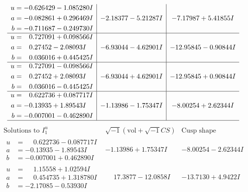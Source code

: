 \documentclass[1p]{elsarticle_modified}
\theoremstyle{definition}
\newcommand{\I}{\sqrt{-1}}
\begin{document}
$$\begin{array}{c|c|c}
\begin{aligned}
u &= -0.626429 - 1.085280 I \\
a &= -0.082861 + 0.296469 I \\
b &= -0.711687 - 0.249730 I\end{aligned}
 & -2.18377 - 5.21287 I & -7.17987 + 5.41855 I \\ \hline\begin{aligned}
u &= \phantom{-}0.727091 + 0.098566 I \\
a &= \phantom{-}0.27452 - 2.08093 I \\
b &= \phantom{-}0.036016 + 0.445425 I\end{aligned}
 & -6.93044 - 4.62901 I & -12.95845 - 0.90844 I \\ \hline\begin{aligned}
u &= \phantom{-}0.727091 - 0.098566 I \\
a &= \phantom{-}0.27452 + 2.08093 I \\
b &= \phantom{-}0.036016 - 0.445425 I\end{aligned}
 & -6.93044 + 4.62901 I & -12.95845 + 0.90844 I \\ \hline\begin{aligned}
u &= \phantom{-}0.622736 + 0.087717 I \\
a &= -0.13935 + 1.89543 I \\
b &= -0.007001 - 0.462890 I\end{aligned}
 & -1.13986 - 1.75347 I & -8.00254 + 2.62344 I\\
 \hline 
 \end{array}$$\newpage$$\begin{array}{c|c|c}  
\text{Solutions to }I^u_{1}& \I (\text{vol} + \sqrt{-1}CS) & \text{Cusp shape}\\
 \hline 
\begin{aligned}
u &= \phantom{-}0.622736 - 0.087717 I \\
a &= -0.13935 - 1.89543 I \\
b &= -0.007001 + 0.462890 I\end{aligned}
 & -1.13986 + 1.75347 I & -8.00254 - 2.62344 I \\ \hline\begin{aligned}
u &= \phantom{-}1.15558 + 1.02594 I \\
a &= \phantom{-}0.454735 + 1.318780 I \\
b &= -2.17085 - 0.53930 I\end{aligned}
 & \phantom{-}17.3877 - 12.0858 I & -13.7130 + 4.9422 I \\ \hline\begin{aligned}

\end{aligned}
\end{array}$$
\end{document}
